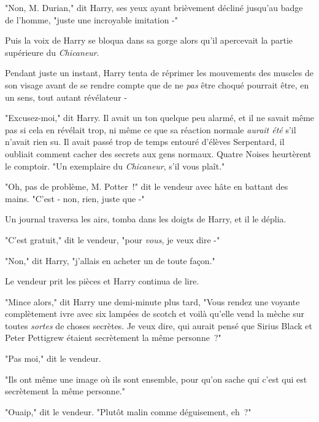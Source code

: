 "Non, M. Durian," dit Harry, ses yeux ayant brièvement décliné jusqu'au badge de l'homme, "juste une incroyable imitation -"

Puis la voix de Harry se bloqua dans sa gorge alors qu'il apercevait la partie supérieure du \emph{Chicaneur}.

Pendant juste un instant, Harry tenta de réprimer les mouvements des muscles de son visage avant de se rendre compte que de ne \emph{pas} être choqué pourrait être, en un sens, tout autant révélateur -

"Excusez-moi," dit Harry. Il avait un ton quelque peu alarmé, et il ne savait même pas si cela en révélait trop, ni même ce que sa réaction normale \emph{aurait été} s'il n'avait rien su. Il avait passé trop de temps entouré d'élèves Serpentard, il oubliait comment cacher des secrets aux gens normaux. Quatre Noises heurtèrent le comptoir. "Un exemplaire du \emph{Chicaneur}, s'il vous plaît."

"Oh, pas de problème, M. Potter~!" dit le vendeur avec hâte en battant des mains. "C'est - non, rien, juste que -"

Un journal traversa les airs, tomba dans les doigts de Harry, et il le déplia.


"C'est gratuit," dit le vendeur, "pour \emph{vous}, je veux dire -"

"Non," dit Harry, "j'allais en acheter un de toute façon."

Le vendeur prit les pièces et Harry continua de lire.

"Mince alors," dit Harry une demi-minute plus tard, "Vous rendez une voyante complètement ivre avec six lampées de scotch et voilà qu'elle vend la mèche sur toutes \emph{sortes} de choses secrètes. Je veux dire, qui aurait pensé que Sirius Black et Peter Pettigrew étaient secrètement la même personne~?"

"Pas moi," dit le vendeur.

"Ils ont même une image où ils sont ensemble, pour qu'on sache qui c'est qui est secrètement la même personne."

"Ouaip," dit le vendeur. "Plutôt malin comme déguisement, eh~?"

